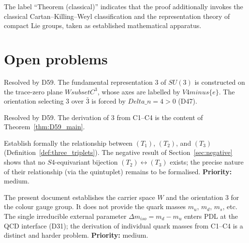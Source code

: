 \documentclass[11pt,a4paper]{article}
\def\Sfour{S4}%
\def\Vfour{V4}%
\def\SUthree{SU(3)}%
\def\SUthreec{SU(3)c}%
\def\Kfour{K4}%
\def\setminus{ minus }%
\def\subset{ subset }%
\def\mathbb#1{#1}%
\def\mathrm#1{#1}%
\def\mathbf#1{#1}%
\def\Dn{Delta\_n}%
\newenvironment{openproblem}[1][]{%
  \begin{tcolorbox}[openproblemstyle,title={Open Problem\ifx\relax#1\relax\else: #1\fi}]}{\end{tcolorbox}}
\newenvironment{resolvedproblem}[1][]{%
  \begin{tcolorbox}[resolvedstyle,title={Resolved\ifx\relax#1\relax\else: #1\fi}]}{\end{tcolorbox}}
\theoremstyle{plain}
\theoremstyle{definition}
\theoremstyle{remark}
\newcommand{\Kfour}{K_4}
\newcommand{\Sfour}{S_4}
\newcommand{\Vfour}{V_4}
\newcommand{\SUthree}{\mathrm{SU}(3)}
\newcommand{\SUthreec}{\mathrm{SU}(3)_c}
\newcommand{\Dn}{\Delta n}
\newcommand{\Dm}{\Delta m}
\begin{document}
The label ``Theorem (classical)'' indicates that the proof additionally invokes the classical Cartan--Killing--Weyl classification and the representation theory of compact Lie groups, taken as established mathematical apparatus.

\section{Open problems}
\label{sec:openproblems}

\begin{resolvedproblem}[OP-D58-1 --- Physical identification of $\SUthreec$, resolved by D59]
\label{rp:D58-1}
\textcolor{resolvedgreen}{Resolved by D59.} The fundamental representation $\mathbf{3}$ of $\SUthree$ is constructed on the trace-zero plane $W \subset \mathbb{C}^3$, whose axes are labelled by $\Vfour \setminus \{e\}$. The orientation selecting $\mathbf{3}$ over $\bar{\mathbf{3}}$ is forced by $\Dn = 4 > 0$ (D47).
\end{resolvedproblem}

\begin{resolvedproblem}[OP-D58-3 --- Fundamental representation $\mathbf{3}$ from C1--C4, resolved by D59]
\label{rp:D58-3}
\textcolor{resolvedgreen}{Resolved by D59.} The derivation of $\mathbf{3}$ from C1--C4 is the content of Theorem~\ref{thm:D59_main}.
\end{resolvedproblem}

\begin{openproblem}[OP-D58-2 --- The three triplets of $\Kfour$]
\label{op:D58-2}
Establish formally the relationship between $(T_1)$, $(T_2)$, and $(T_3)$ (Definition~\ref{def:three_triplets}). The negative result of Section~\ref{sec:negative} shows that no $\Sfour$-equivariant bijection $(T_2) \leftrightarrow (T_3)$ exists; the precise nature of their relationship (via the quintuplet) remains to be formalised. \textbf{Priority:} medium.
\end{openproblem}

\begin{openproblem}[OP-D59-1 --- Quark mass spectrum from C1--C4]
\label{op:D59-1}
The present document establishes the carrier space $W$ and the orientation $\mathbf{3}$ for the colour gauge group. It does not provide the quark masses $m_u$, $m_d$, $m_s$, etc. The single irreducible external parameter $\Dm_{\mathrm{iso}} = m_d - m_u$ enters PDL at the QCD interface (D31); the derivation of individual quark masses from C1--C4 is a distinct and harder problem. \textbf{Priority:} medium.
\end{openproblem}
\end{document}
